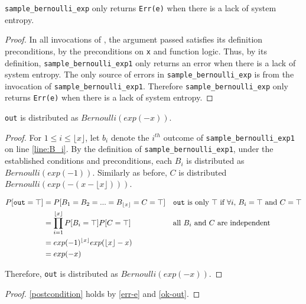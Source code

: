 \documentclass{article}
\begin{document}
\begin{lemma}
    \label{err-e}
    \texttt{sample\_bernoulli\_exp} only returns \texttt{Err(e)} when there is a lack of system entropy.
\end{lemma}

\begin{proof}
    In all invocations of , the argument passed satisfies its definition preconditions,
    by the preconditions on \texttt{x} and function logic.
    Thus, by its definition, \texttt{sample\_bernoulli\_exp1} only returns an error when there is a lack of system entropy.
    The only source of errors in \texttt{sample\_bernoulli\_exp} is from the invocation of \texttt{sample\_bernoulli\_exp1}.
    Therefore \texttt{sample\_bernoulli\_exp} only returns \texttt{Err(e)} when there is a lack of system entropy.
\end{proof}

\begin{lemma}
    \label{ok-out}
    \texttt{out} is distributed as $Bernoulli(exp(-x))$.
\end{lemma}

\begin{proof}
    For $1 \le i \le \lfloor x \rfloor$, let $b_i$ denote the $i^{th}$ outcome of \texttt{sample\_bernoulli\_exp1} on line \ref{line:B_i}.
    By the definition of \texttt{sample\_bernoulli\_exp1}, under the established conditions and preconditions,
    each $B_i$ is distributed as $Bernoulli(exp(-1))$.
    Similarly as before, $C$ is distributed $Bernoulli(exp(-(x - \lfloor x \rfloor)))$.

    \begin{align*}
        P[\texttt{out} = \top] &= P[B_1 = B_2 = ... = B_{\lfloor x \rfloor} = C = \top] && \text{\texttt{out} is only $\top$ if $\forall i$, $B_i = \top$ and $C = \top$} \\
        &= \prod_{i=1}^{\lfloor x \rfloor} P[B_i = \top] P[C = \top] && \text{all $B_i$ and $C$ are independent} \\
        &= exp(-1)^{\lfloor x \rfloor} exp(\lfloor x \rfloor - x) \\
        &= exp(-x)
    \end{align*}

    Therefore, \texttt{out} is distributed as $Bernoulli(exp(-x))$.
\end{proof}


\begin{proof}
    \ref{postcondition} holds by \ref{err-e} and \ref{ok-out}.
\end{proof}



\end{document}

